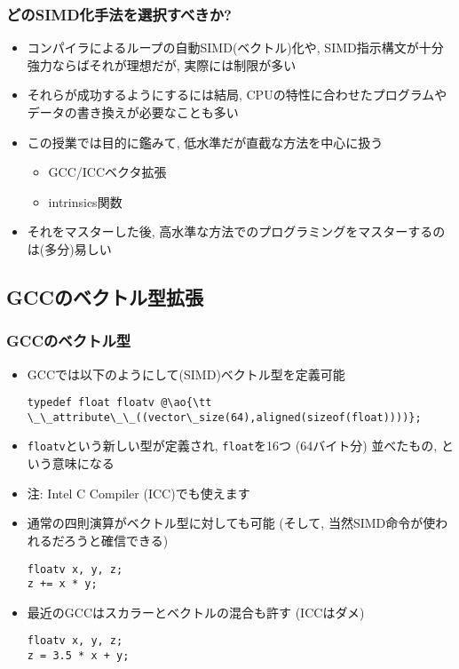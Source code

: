 \documentclass[10pt,dvipdfmx]{beamer}
\newcommand{\ao}[1]{{\color{blue}#1}}
\begin{document}
\begin{frame}
  \frametitle{どのSIMD化手法を選択すべきか?}
  \begin{itemize}
  \item コンパイラによるループの自動SIMD(ベクトル)化や,
    SIMD指示構文が十分強力ならばそれが理想だが,
    実際には制限が多い
  \item それらが成功するようにするには結局,
    CPUの特性に合わせたプログラムやデータの書き換えが必要なことも多い
  \item この授業では目的に鑑みて, 低水準だが直截な方法を中心に扱う
    \begin{itemize}
\item \ao{GCC/ICCベクタ拡張}
\item \ao{intrinsics関数} 
    \end{itemize}
    
  \item それをマスターした後,
    高水準な方法でのプログラミングをマスターするのは(多分)易しい
  \end{itemize}
\end{frame}


\subsection{GCCのベクトル型拡張}

\begin{frame}[fragile]
\frametitle{GCCのベクトル型}
\begin{itemize}
\item GCCでは以下のようにして(SIMD)ベクトル型を定義可能
\begin{lstlisting}
typedef float floatv @\ao{\tt \_\_attribute\_\_((vector\_size(64),aligned(sizeof(float))))};
\end{lstlisting}

\item {\tt floatv}という新しい型が定義され, {\tt float}を16つ (64バイト分)
  並べたもの, という意味になる
  
\item 注: Intel C Compiler (ICC)でも使えます

\item 通常の四則演算がベクトル型に対しても可能
  (そして, 当然SIMD命令が使われるだろうと確信できる)
\begin{lstlisting}
floatv x, y, z;
z += x * y;
\end{lstlisting}

\item 最近のGCCはスカラーとベクトルの混合も許す (ICCはダメ)
\begin{lstlisting}
floatv x, y, z;
z = 3.5 * x + y;
\end{lstlisting}
\end{itemize}
\end{frame}
\end{document}
